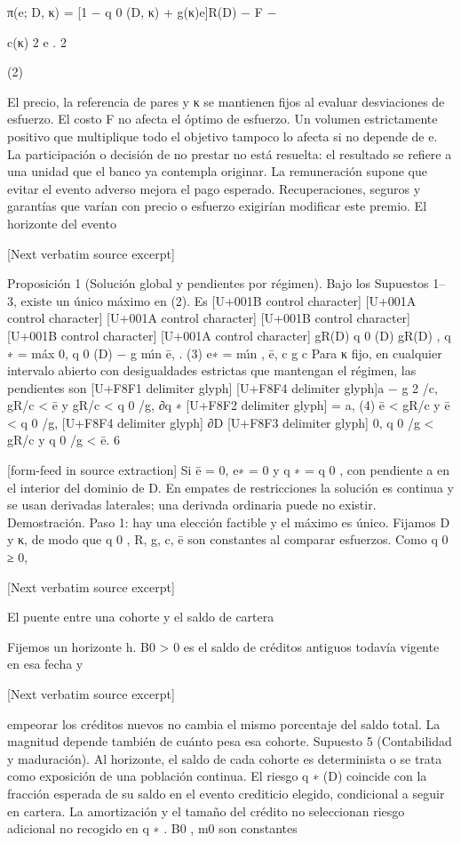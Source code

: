 \documentclass[10pt]{article}
\begin{document}
\begin{ReviewVerbatim}
π(e; D, κ) = [1 − q 0 (D, κ) + g(κ)e]R(D) − F −

c(κ) 2
e .
2

(2)

El precio, la referencia de pares y κ se mantienen ﬁjos al evaluar desviaciones de esfuerzo.
El costo F no afecta el óptimo de esfuerzo. Un volumen estrictamente positivo que multiplique
todo el objetivo tampoco lo afecta si no depende de e. La participación o decisión de no prestar
no está resuelta: el resultado se reﬁere a una unidad que el banco ya contempla originar. La remuneración supone que evitar el evento adverso mejora el pago esperado. Recuperaciones, seguros y
garantías que varían con precio o esfuerzo exigirían modiﬁcar este premio. El horizonte del evento

[Next verbatim source excerpt]


Proposición 1 (Solución global y pendientes por régimen). Bajo los Supuestos 1–3, existe un
único máximo en (2). Es
[U+001B control character]
[U+001A control character]
[U+001A control character]
[U+001B control character][U+001B control character]
[U+001A control character]
gR(D)
q 0 (D)
gR(D)
,
q ∗ = máx 0, q 0 (D) − g mı́n ē,
.
(3)
e∗ = mı́n
, ē,
c
g
c
Para κ ﬁjo, en cualquier intervalo abierto con desigualdades estrictas que mantengan el régimen,
las pendientes son
[U+F8F1 delimiter glyph]
[U+F8F4 delimiter glyph]a − g 2 /c, gR/c < ē y gR/c < q 0 /g,
∂q ∗ [U+F8F2 delimiter glyph]
= a,
(4)
ē < gR/c y ē < q 0 /g,
[U+F8F4 delimiter glyph]
∂D
[U+F8F3 delimiter glyph]
0,
q 0 /g < gR/c y q 0 /g < ē.
6


[form-feed in source extraction]
Si ē = 0, e∗ = 0 y q ∗ = q 0 , con pendiente a en el interior del dominio de D. En empates de
restricciones la solución es continua y se usan derivadas laterales; una derivada ordinaria puede
no existir.
Demostración. Paso 1: hay una elección factible y el máximo es único.
Fijamos D y κ, de modo que q 0 , R, g, c, ē son constantes al comparar esfuerzos. Como q 0 ≥ 0,

[Next verbatim source excerpt]

El puente entre una cohorte y el saldo de cartera

Fijemos un horizonte h. B0 > 0 es el saldo de créditos antiguos todavía vigente en esa fecha y

[Next verbatim source excerpt]

empeorar los créditos nuevos no cambia el mismo porcentaje del saldo total. La magnitud depende
también de cuánto pesa esa cohorte.
Supuesto 5 (Contabilidad y maduración). Al horizonte, el saldo de cada cohorte es determinista
o se trata como exposición de una población continua. El riesgo q ∗ (D) coincide con la fracción
esperada de su saldo en el evento crediticio elegido, condicional a seguir en cartera. La amortización
y el tamaño del crédito no seleccionan riesgo adicional no recogido en q ∗ . B0 , m0 son constantes


\end{ReviewVerbatim}
\end{document}
